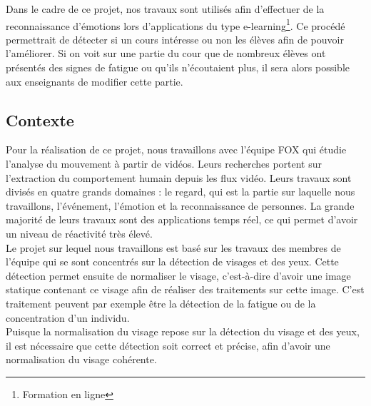 Dans le cadre de ce projet, nos travaux sont utilisés  
afin d'effectuer de la reconnaissance d'émotions lors d'applications
du type e-learning\footnote{Formation en ligne}. Ce procédé permettrait de détecter si un cours 
intéresse ou non les élèves afin de pouvoir l'améliorer. Si on voit sur une partie du cour
que de nombreux élèves ont présentés des signes de fatigue ou qu'ils n'écoutaient plus, il sera
alors possible aux enseignants de modifier cette partie.\\


\subsection{Contexte}
Pour la réalisation de ce projet, nous travaillons avec l'équipe FOX qui étudie
l'analyse du mouvement à partir de vidéos. Leurs recherches portent
sur l'extraction du comportement humain depuis les flux vidéo.  Leurs travaux sont
divisés en quatre grands domaines : le regard, qui est la partie sur laquelle nous travaillons, l'événement, l'émotion et la
reconnaissance de personnes. La grande majorité de leurs travaux sont
des applications temps réel, ce qui permet d'avoir un niveau de réactivité très élevé.\\ 

Le projet sur lequel nous travaillons est basé sur les travaux des membres de l'équipe qui se sont concentrés sur la
détection de visages et des yeux. Cette détection permet ensuite de normaliser le visage, c'est-à-dire
d'avoir une image statique contenant ce visage afin de réaliser des traitements sur cette image. C'est
traitement peuvent par exemple être la détection de la fatigue ou de la concentration d'un individu.\\

Puisque la normalisation du visage repose sur la détection du visage et des yeux, il est nécessaire que cette 
détection soit correct et précise, afin d'avoir une normalisation du visage cohérente.\\


